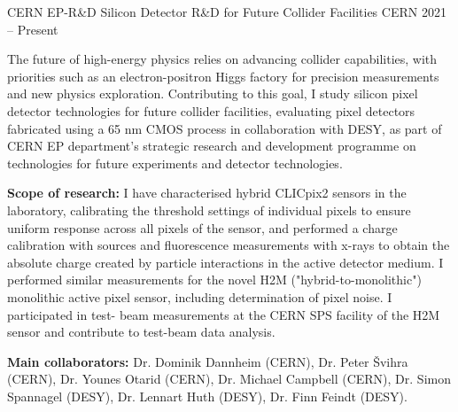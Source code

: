 \begin{cventries}
  \cventry
    {CERN EP-R\&D} %
    {Silicon Detector R\&D for Future Collider Facilities} %
    {CERN} %
    {2021 -- Present} %
  {
    \begin{cvitems} %
      \item {The future of high-energy physics relies on advancing collider capabilities, with priorities such as an electron-positron Higgs factory for precision measurements and new physics exploration.
      Contributing to this goal, I study silicon pixel detector technologies for future collider facilities, evaluating pixel detectors fabricated using a 65 nm CMOS process in collaboration with DESY, as part of CERN EP department's strategic research and development programme on technologies for future experiments and detector technologies.}
      \item \textbf{Scope of research:} I have characterised hybrid CLICpix2 sensors in the laboratory, calibrating the threshold settings of individual pixels to ensure uniform response across all pixels of the sensor, and performed a charge calibration with sources and fluorescence measurements with x-rays to obtain the absolute charge created by particle interactions in the active detector medium. I performed similar measurements for the novel H2M ("hybrid-to-monolithic")
      monolithic active pixel sensor, including determination of pixel noise. I participated in test-
      beam measurements at the CERN SPS facility of the H2M sensor and contribute to test-beam
      data analysis.
      \item \textbf{Main collaborators:} Dr. Dominik Dannheim (CERN), Dr. Peter Švihra (CERN), Dr. Younes
      Otarid (CERN), Dr. Michael Campbell (CERN), Dr. Simon Spannagel (DESY), Dr. Lennart
      Huth (DESY), Dr. Finn Feindt (DESY).
    \end{cvitems}
  }

\end{cventries}

